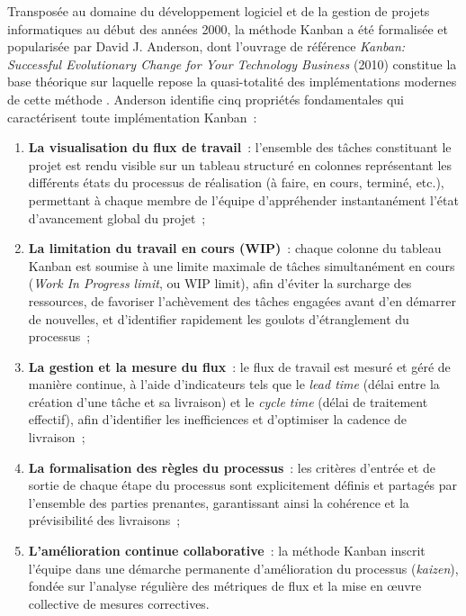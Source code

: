 Transposée au domaine du développement logiciel et de la gestion de
projets informatiques au début des années 2000, la méthode Kanban
a été formalisée et popularisée par David J. Anderson, dont l'ouvrage
de référence \textit{Kanban: Successful Evolutionary Change for Your
	Technology Business} (2010) constitue la base théorique sur laquelle
repose la quasi-totalité des implémentations modernes de cette
méthode \cite{anderson2015essential}. Anderson identifie cinq propriétés
fondamentales qui caractérisent toute implémentation Kanban~:

\begin{enumerate}
	\item \textbf{La visualisation du flux de travail}~: l'ensemble des
	tâches constituant le projet est rendu visible sur un tableau
	structuré en colonnes représentant les différents états du processus
	de réalisation (à faire, en cours, terminé, etc.), permettant à
	chaque membre de l'équipe d'appréhender instantanément l'état
	d'avancement global du projet~;
	
	\item \textbf{La limitation du travail en cours (WIP)}~: chaque
	colonne du tableau Kanban est soumise à une limite maximale de
	tâches simultanément en cours (\textit{Work In Progress limit},
	ou WIP limit), afin d'éviter la surcharge des ressources, de
	favoriser l'achèvement des tâches engagées avant d'en démarrer
	de nouvelles, et d'identifier rapidement les goulots d'étranglement
	du processus~;
	
	\item \textbf{La gestion et la mesure du flux}~: le flux de travail
	est mesuré et géré de manière continue, à l'aide d'indicateurs
	tels que le \textit{lead time} (délai entre la création d'une tâche
	et sa livraison) et le \textit{cycle time} (délai de traitement
	effectif), afin d'identifier les inefficiences et d'optimiser
	la cadence de livraison~;
	
	\item \textbf{La formalisation des règles du processus}~: les
	critères d'entrée et de sortie de chaque étape du processus sont
	explicitement définis et partagés par l'ensemble des parties
	prenantes, garantissant ainsi la cohérence et la prévisibilité
	des livraisons~;
	
	\item \textbf{L'amélioration continue collaborative}~: la méthode
	Kanban inscrit l'équipe dans une démarche permanente d'amélioration
	du processus (\textit{kaizen}), fondée sur l'analyse régulière
	des métriques de flux et la mise en \oe uvre collective de mesures
	correctives.
\end{enumerate}

